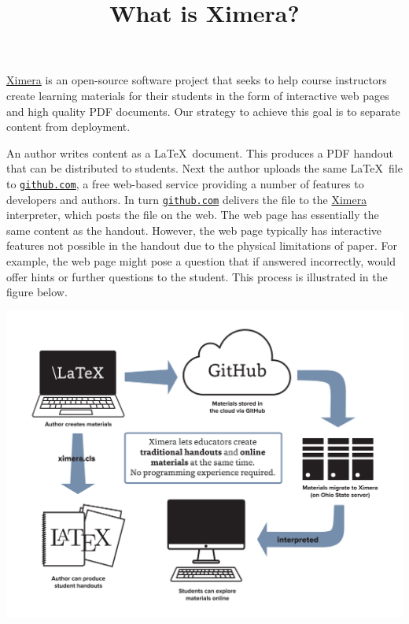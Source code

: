 \documentclass{ximera}
\title{What is Ximera?}
\begin{document}
\maketitle

\href{http://ximera.osu.edu}{\sf Ximera} is an open-source software project that seeks to help course instructors create learning materials for their students in the form of interactive web pages and high quality PDF documents.
Our strategy to achieve this goal is to separate content from deployment.

An author writes content as a \LaTeX\ document.
This produces a PDF handout that can be distributed to students.
Next the author uploads the same \LaTeX\ file to \href{http://github.com}{\tt github.com},
a free web-based service providing a number of features to developers and authors.
In turn \href{http://github.com}{\tt github.com} delivers the file to the \href{http://ximera.osu.edu}{\sf Ximera} interpreter, which posts the file on the web.
The web page has essentially the same content as the handout.
However, the web page typically has interactive features not possible in the handout due to the physical limitations of paper.
For example, the web page might pose a question that if answered incorrectly, would offer hints or further questions
to the student.
This process is illustrated in the figure below.

\begin{image}
\includegraphics[scale=.25]{XimeraGraphic.png}
\end{image}
\end{document}
